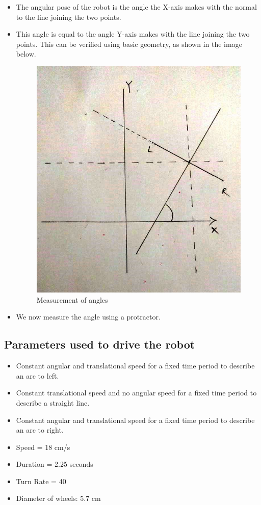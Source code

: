 \documentclass[10pt,a4paper]{article}
\begin{document}
\begin{itemize}
\begin{itemize}
							\item The angular pose of the robot is the angle the X-axis makes with the normal to the line joining the two points.
							\item This angle is equal to the angle Y-axis makes with the line joining the two points. This can be verified using basic geometry, as shown in the image below.
							\begin{figure}[h]
								\centering
								\includegraphics[width=0.4\linewidth]{img/angles.jpeg}
								\caption{Measurement of angles}
								\label{fig:angGeometry}
							\end{figure}
							\item We now measure the angle using a protractor.
						\end{itemize}
				\end{itemize}
			\subsection{Parameters used to drive the robot}
				\begin{itemize}
					\item Constant angular and translational speed for a fixed time period to describe an arc to left.
					\item Constant translational speed and no angular speed for a fixed time period to describe a straight line.
					\item Constant angular and translational speed for a fixed time period to describe an arc to right.
					\item Speed = 18 cm/s
					\item Duration = 2.25 seconds
					\item Turn Rate = 40
					\item Diameter of wheels: 5.7 cm
				\end{itemize}
\end{document}
